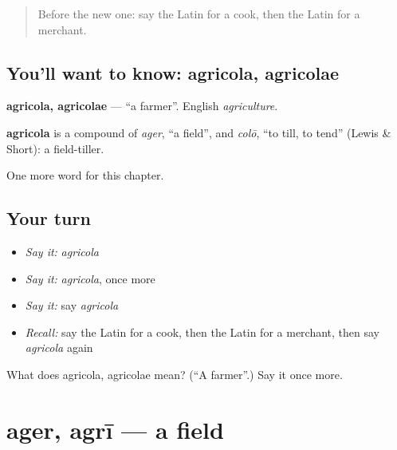 \label{lesson:LA-C74-agricola}



\begin{quote}
Before the new one: say the Latin for a cook, then the Latin for a merchant.
\end{quote}

\subsection*{You'll want to know: agricola, agricolae}
\textbf{agricola, agricolae} — \textquotedblleft{}a farmer\textquotedblright{}. English \emph{agriculture}.

\begin{cousinweb}
\textbf{agricola} is a compound of \emph{ager}, \textquotedblleft{}a field\textquotedblright{}, and \emph{colō}, \textquotedblleft{}to till, to tend\textquotedblright{} (Lewis \& Short): a field-tiller.
\end{cousinweb}

\begin{grammarlens}[title={What you've built}]
One more word for this chapter.
\end{grammarlens}

\subsection*{Your turn}
\begin{itemize}
\raggedright
  \item \emph{Say it:} \emph{agricola}
  \item \emph{Say it:} \emph{agricola}, once more
  \item \emph{Say it:} say \emph{agricola}
  \item \emph{Recall:} say the Latin for a cook, then the Latin for a merchant, then say \emph{agricola} again
\end{itemize}

\begin{tcolorbox}[breakable,colback=teal!4,colframe=teal!35!black,title={Before you move on}]
What does agricola, agricolae mean? (\textquotedblleft{}A farmer\textquotedblright{}.) Say it once more.
\end{tcolorbox}
\section[ager, agrī]{ager, agrī — a field}

\label{lesson:LA-C74-ager}



